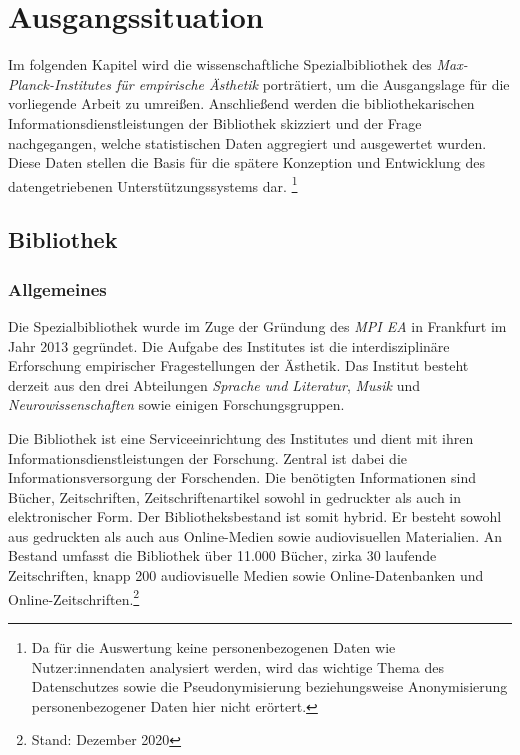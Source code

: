 \chapter{Ausgangssituation}
\label{chap:three}
Im folgenden Kapitel wird die wissenschaftliche Spezialbibliothek des \textit{Max-Planck-Institutes für empirische Ästhetik} porträtiert,
um die Ausgangslage für die vorliegende Arbeit zu umreißen.
Anschließend werden die bibliothekarischen Informationsdienstleistungen der Bibliothek skizziert und der Frage nachgegangen, 
welche statistischen Daten aggregiert und ausgewertet wurden. Diese Daten stellen die Basis für die spätere Konzeption und Entwicklung des datengetriebenen Unterstützungssystems dar.
\footnote{Da für die Auswertung keine personenbezogenen Daten wie Nutzer:innendaten analysiert werden, wird das wichtige Thema des Datenschutzes sowie
die Pseudonymisierung beziehungsweise Anonymisierung personenbezogener Daten hier nicht erörtert.} 

\section{Bibliothek}
\label{chap:three_one}
\subsection{Allgemeines}
Die Spezialbibliothek wurde im Zuge der Gründung des \textit{\acrshort{MPI EA}}
in Frankfurt im Jahr 2013 gegründet. Die Aufgabe des Institutes ist die interdisziplinäre Erforschung 
empirischer Fragestellungen der Ästhetik. Das Institut besteht derzeit aus den drei Abteilungen \textit{Sprache und Literatur}, 
\textit{Musik} und \textit{Neurowissenschaften} sowie einigen Forschungsgruppen. %



Die Bibliothek ist eine Serviceeinrichtung des Institutes und dient mit ihren Informationsdienstleistungen 
der Forschung.
Zentral ist dabei die Informationsversorgung der Forschenden. Die benötigten Informationen sind Bücher, 
Zeitschriften, Zeitschriftenartikel sowohl in gedruckter als auch in elektronischer Form.
Der Bibliotheksbestand ist somit hybrid. Er besteht sowohl aus gedruckten als auch aus Online-Medien sowie 
audiovisuellen Materialien. An Bestand umfasst die Bibliothek über 11.000 Bücher, zirka 30 laufende Zeitschriften, 
knapp 200 audiovisuelle Medien sowie Online-Datenbanken und Online-Zeitschriften.\footnote{Stand: Dezember 2020}

